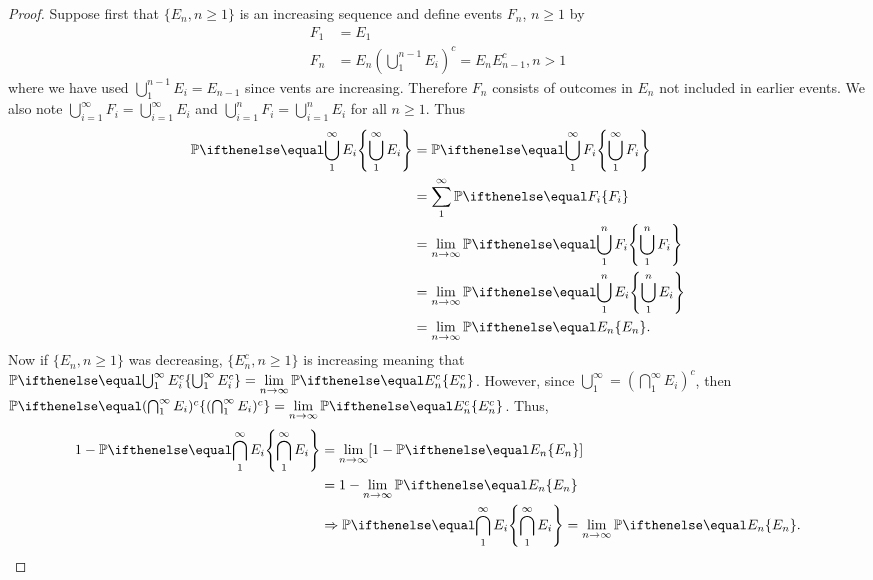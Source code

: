\documentclass[a4paper,11pt]{article}
\begin{document}
\begin{outline}
    \begin{proof}
      Suppose first that \(\{E_n, n \geq 1\}\) is an increasing sequence and define events \(F_n\), \(n \geq 1\) by
      \begin{align*}
        F_1 &= E_1\\
        F_n &= E_n(\bigcup_{1}^{n-1}E_i)^c = E_nE_{n-1}^c, n > 1
      \end{align*}
      where we have used \(\bigcup_{1}^{n-1}E_i = E_{n-1}\) since vents are increasing. Therefore \(F_n\) consists
      of outcomes in \(E_n\) not included in earlier events. We also note \(\bigcup_{i=1}^{\infty} F_i = 
      \bigcup_{i=1}^{\infty} E_i\) and \(\bigcup_{i=1}^{n} F_i = \bigcup_{i=1}^{n} E_i\) for all \(n \geq 1\). Thus 
      \begin{align*}
        \bbp[\bigcup_{1}^{\infty} E_i] &= \bbp[\bigcup_{1}^{\infty} F_i]\\
                                             &= \sum_{1}^{\infty} \bbp[F_i]\\
                                             &= \lim_{n\rightarrow\infty} \bbp[\bigcup_{1}^n F_i]\\
                                             &= \lim_{n\rightarrow\infty} \bbp[\bigcup_{1}^n E_i]\\
                                             &= \lim_{n\rightarrow\infty} \bbp[E_n]\text{.}
      \end{align*}
      Now if \(\{E_n, n \geq 1\}\) was decreasing, \(\{E_n^c, n \geq 1\}\) is increasing meaning that
      \(\bbp[\bigcup_{1}^{\infty} E_i^c] = \lim\limits_{n\rightarrow\infty} \bbp[E_n^c]\).
      However, since \(\bigcup_{1}^{\infty} = (\bigcap_{1}^{\infty}E_i)^c\), then 
      \(\bbp[(\bigcap_{1}^{\infty}E_i)^c] = \lim\limits_{n\rightarrow\infty} \bbp[E_n^c]\). Thus,
      \begin{align*}
        1 - \bbp[\bigcap_{1}^{\infty} E_i] &= \lim_{n\rightarrow\infty} [1-\bbp[E_n]] \\
                                           &= 1 - \lim_{n\rightarrow\infty} \bbp[E_n] \\
                                           &\Rightarrow \bbp[\bigcap_{1}^{\infty} E_i] 
                                           = \lim_{n\rightarrow\infty}\bbp[E_n]\text{.}
      \end{align*}
    \end{proof}
    
\end{outline}
\end{document}
